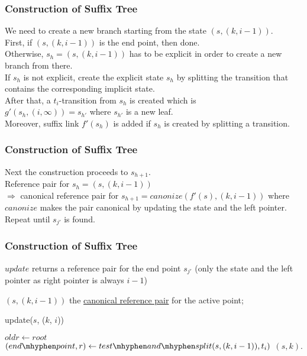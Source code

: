 \documentclass[compress,usenames,dvipsnames]{beamer}
\let\oldnl\nl%
\newcommand{\nonl}{\renewcommand{\nl}{\let\nl\oldnl}}%
\begin{document}
    \begin{frame}\frametitle{Construction of Suffix Tree}
        We need to create a new branch starting from the state $(s, (k, i - 1))$. \\
        \hfill \break
        First, if $(s, (k, i - 1))$ is the end point, then done. \\
        Otherwise, $s_h = (s, (k, i - 1))$ has to be explicit in order to create a new branch from there. \\
        \hfill \break
        If $s_h$ is not explicit, create the explicit state $s_h$ by splitting the transition that contains the corresponding implicit state. \\
        After that, a $t_i$-transition from $s_h$ is created which is \\
        $g'(s_h, (i, \infty)) = s_{h'}$ where $s_{h'}$ is a new leaf. \\
        Moreover, suffix link $f'(s_h)$ is added if $s_h$ is created by splitting a transition.
    \end{frame}

    \begin{frame}\frametitle{Construction of Suffix Tree}
        Next the construction proceeds to $s_{h+1}$. \\
        \hfill \break
        Reference pair for $s_h = (s, (k, i - 1)) $ \\ 
        $\Rightarrow $ canonical reference pair for $s_{h+1} = canonize(f'(s), (k, i-1))$ where $canonize$ makes the pair canonical by updating the state and the left pointer. \\
        \hfill \break
        Repeat until $s_{j'}$ is found.
    \end{frame}

    \begin{frame}\frametitle{Construction of Suffix Tree}
        $update$ returns a reference pair for the end point $s_{j'}$ (only the state and the left pointer as right pointer is always $i - 1$) \\
        \hfill \break
        \LinesNumbered
        \begin{procedure}[H]
            \SetAlgoNoEnd
            \nonl $(s, (k, i - 1))$ the \underline{canonical reference pair} for the active point;
            \caption{update($s$, ($k$, $i$))}
            $oldr \leftarrow root$\;
            $(end\mhyphen point,r) \leftarrow test \mhyphen and \mhyphen split(s, (k, i - 1)),t_i)$\;
            \Return $(s, k)$.
        \end{procedure}
    \end{frame}
\end{document}
